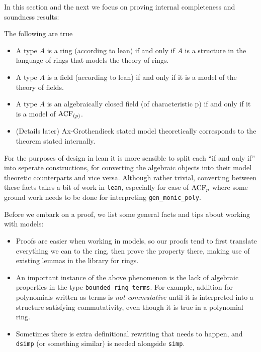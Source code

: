 In this section and the next we focus on proving internal
completeness and soundness results:
\begin{prop}
  The following are true
  \begin{itemize}
    \item A type $A$ is a ring (according to lean) if and only if
          $A$ is a structure in the language of rings
          that models the theory of rings.
    \item A type $A$ is a field (according to lean) if and only if
          it is a model of the theory of fields.
    \item A type $A$ is an algebraically closed field (of characteristic p)
          if and only if it is a model of $\operatorname{ACF}_{(p)}$.
    \item (Details later) Ax-Grothendieck stated model theoretically corresponds to
          the theorem stated internally.
  \end{itemize}
  For the purposes of design in lean it is
  more sensible to split each ``if and only if'' into seperate constructions,
  for converting the algebraic objects into their model theoretic counterparts
  and vice versa.
  Although rather trivial,
  converting between these facts takes a bit of work in \texttt{lean},
  especially for case of $\operatorname{ACF}_{p}$
  where some ground work needs to be done for interpreting \texttt{gen\_monic\_poly}.
\end{prop}

Before we embark on a proof,
we list some general facts and tips about working with models:
\begin{itemize}
  \item Proofs are easier when working in models, so our proofs tend to
        first translate everything we can to the ring,
        then prove the property there,
        making use of existing lemmas in the library for rings.
  \item An important instance of the above phenomenon is the lack
        of algebraic properties in the type \texttt{bounded\_ring\_terms}.
        For example, addition for polynomials written as terms
        is \textit{not commutative} until it is interpreted into a structure
        satisfying commutativity,
        even though it is true in a polynomial ring.
  \item Sometimes there is extra definitional rewriting that needs to happen,
        and \texttt{dsimp} (or something similar) is needed alongside \texttt{simp}.
\end{itemize}

